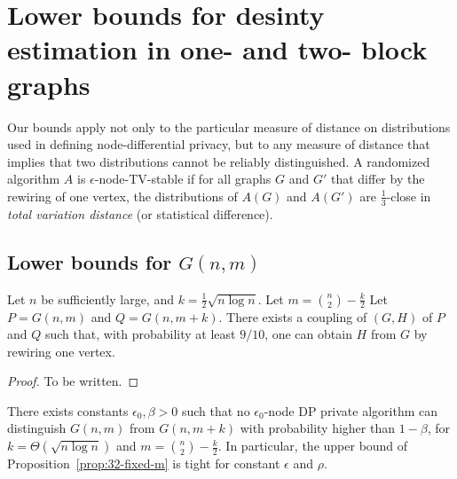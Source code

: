 
\section{Lower bounds for desinty estimation in one- and two- block graphs}
\label{sec:lower}

\begin{remark} Our bounds apply not only to the particular measure of
  distance on distributions used in defining node-differential
  privacy, but to any measure of distance that implies that two
  distributions cannot be reliably distinguished. A randomized
  algorithm $A$ is $\epsilon$-node-TV-stable if for all graphs $G$ and
  $G'$ that differ by the rewiring of one vertex, the distributions of
  $A(G)$ and $A(G')$ are $\tfrac 1 3$-close in \emph{total variation
    distance} (or statistical difference). 
\end{remark}

\subsection{Lower bounds for $G(n,m)$} \label{sec:lower-one-block}

\begin{proposition}
  Let $n$ be sufficiently large, and $k = \tfrac 1 2 \sqrt{n \log
    n}$. Let $m = {\binom n 2} - \frac k 2$ Let $P = G(n,m)$ and
  $Q = G(n,m +k )$.  There exists a coupling of $(G,H)$ of $P$ and $Q$
  such that, with probability at least $9/10$, one can obtain $H$ from
  $G$ by rewiring one vertex.
\end{proposition}

\begin{proof}
  To be written.
\end{proof}

\begin{theorem}
  There exists constants $\epsilon_0,\beta >0$ such that no
  $\epsilon_0$-node DP private algorithm can distinguish $G(n,m)$ from
  $G(n,m +k )$ with probability higher than $1-\beta$, for $k = \Theta(\sqrt{n \log n})$ and $m = \binom n 2
  - \tfrac k 2$.  In particular, the upper bound of
  Proposition~\ref{prop:32-fixed-m} is tight for constant $\epsilon$
  and $\rho$. 
\end{theorem}


